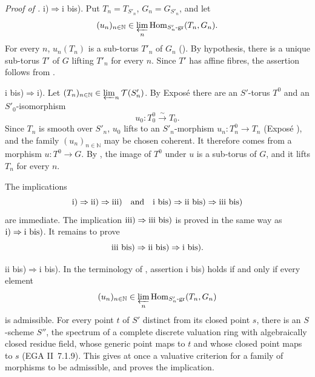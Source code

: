 \medskip\noindent\textit{Proof of .}
\textup{i)}\(\Rightarrow\)\textup{i bis)}.
Put \(T_n=T_{S'_n}\), \(G_n=G_{S'_n}\), and let
\[
 (u_n)_{n\in\mathbb N}\in
 \varprojlim_n\operatorname{Hom}_{S'_n\text{-gr}}(T_n,G_n).
\]
For every \(n\), \(u_n(T_n)\) is a sub-torus \(T'_n\) of \(G_n\)
(). By hypothesis, there is a unique sub-torus \(T'\) of
\(G\) lifting \(T'_n\) for every \(n\). Since \(T'\) has affine
fibres, the assertion follows from .

\textup{i bis)}\(\Rightarrow\)\textup{i)}.
Let
\((T_n)_{n\in\mathbb N}\in\varprojlim_n\mathcal T(S'_n)\).
By Exposé  there are an \(S'\)-torus \(T^0\) and an
\(S'_0\)-isomorphism
\[
  u_0:T^0_0\xrightarrow{\sim}T_0.
\]
Since \(T_n\) is smooth over \(S'_n\), \(u_0\) lifts to an
\(S'_n\)-morphism \(u_n:T^0_n\to T_n\) (Exposé ), and the
family \((u_n)_{n\in\mathbb N}\) may be chosen coherent. It therefore
comes from a morphism \(u:T^0\to G\). By , the image of
\(T^0\) under \(u\) is a sub-torus of \(G\), and it lifts \(T_n\)
for every \(n\).

The implications
\[
 \textup{i)}\Rightarrow\textup{ii)}\Rightarrow\textup{iii)}
 \quad\text{and}\quad
 \textup{i bis)}\Rightarrow\textup{ii bis)}
 \Rightarrow\textup{iii bis)}
\]
are immediate. The implication
\(\textup{iii)}\Rightarrow\textup{iii bis)}\) is proved in the same
way as
\(\textup{i)}\Rightarrow\textup{i bis)}\).
It remains to prove
\[
 \textup{iii bis)}\Rightarrow\textup{ii bis)}
 \Rightarrow\textup{i bis)}.
\]

\textup{ii bis)}\(\Rightarrow\)\textup{i bis)}.
In the terminology of , assertion \textup{i bis)} holds if and
only if every element
\[
 (u_n)_{n\in\mathbb N}\in
 \varprojlim_n\operatorname{Hom}_{S'_n\text{-gr}}(T_n,G_n)
\]
is admissible. For every point \(t\) of \(S'\) distinct from its
closed point \(s\), there is an \(S\)-scheme \(S''\), the spectrum of
a complete discrete valuation ring with algebraically closed residue
field, whose generic point maps to \(t\) and whose closed point maps
to \(s\) (EGA II~7.1.9). This gives at once a valuative criterion for
a family of morphisms to be admissible, and proves the implication.

